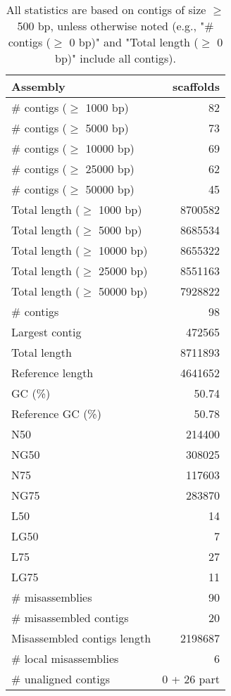 \documentclass[12pt,a4paper]{article}
\begin{document}
\begin{table}[ht]
\begin{center}
\caption{All statistics are based on contigs of size $\geq$ 500 bp, unless otherwise noted (e.g., "\# contigs ($\geq$ 0 bp)" and "Total length ($\geq$ 0 bp)" include all contigs).}
\begin{tabular}{|l*{1}{|r}|}
\hline
Assembly & scaffolds \\ \hline
\# contigs ($\geq$ 1000 bp) & 82 \\ \hline
\# contigs ($\geq$ 5000 bp) & 73 \\ \hline
\# contigs ($\geq$ 10000 bp) & 69 \\ \hline
\# contigs ($\geq$ 25000 bp) & 62 \\ \hline
\# contigs ($\geq$ 50000 bp) & 45 \\ \hline
Total length ($\geq$ 1000 bp) & 8700582 \\ \hline
Total length ($\geq$ 5000 bp) & 8685534 \\ \hline
Total length ($\geq$ 10000 bp) & 8655322 \\ \hline
Total length ($\geq$ 25000 bp) & 8551163 \\ \hline
Total length ($\geq$ 50000 bp) & 7928822 \\ \hline
\# contigs & 98 \\ \hline
Largest contig & 472565 \\ \hline
Total length & 8711893 \\ \hline
Reference length & 4641652 \\ \hline
GC (\%) & 50.74 \\ \hline
Reference GC (\%) & 50.78 \\ \hline
N50 & 214400 \\ \hline
NG50 & 308025 \\ \hline
N75 & 117603 \\ \hline
NG75 & 283870 \\ \hline
L50 & 14 \\ \hline
LG50 & 7 \\ \hline
L75 & 27 \\ \hline
LG75 & 11 \\ \hline
\# misassemblies & 90 \\ \hline
\# misassembled contigs & 20 \\ \hline
Misassembled contigs length & 2198687 \\ \hline
\# local misassemblies & 6 \\ \hline
\# unaligned contigs & 0 + 26 part \\ \hline

\end{tabular}
\end{center}
\end{table}
\end{document}
